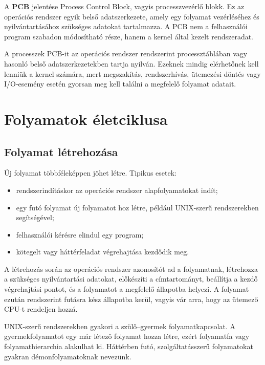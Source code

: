 A \textbf{PCB} jelentése Process Control Block, vagyis processzvezérlő blokk. Ez az operációs rendszer egyik belső adatszerkezete, amely egy folyamat vezérléséhez és nyilvántartásához szükséges adatokat tartalmazza. A PCB nem a felhasználói program szabadon módosítható része, hanem a kernel által kezelt rendszeradat.

A processzek PCB-it az operációs rendszer rendszerint processztáblában vagy hasonló belső adatszerkezetekben tartja nyilván. Ezeknek mindig elérhetőnek kell lenniük a kernel számára, mert megszakítás, rendszerhívás, ütemezési döntés vagy I/O-esemény esetén gyorsan meg kell találni a megfelelő folyamat adatait.

\begin{center}

\end{center}

\section{Folyamatok életciklusa}

\subsection{Folyamat létrehozása}

Új folyamat többféleképpen jöhet létre. Tipikus esetek:

\begin{itemize}
  \item rendszerindításkor az operációs rendszer alapfolyamatokat indít;
  \item egy futó folyamat új folyamatot hoz létre, például UNIX-szerű rendszerekben  segítségével;
  \item felhasználói kérésre elindul egy program;
  \item kötegelt vagy háttérfeladat végrehajtása kezdődik meg.
\end{itemize}

A létrehozás során az operációs rendszer azonosítót ad a folyamatnak, létrehozza a szükséges nyilvántartási adatokat, előkészíti a címtartományt, beállítja a kezdő végrehajtási pontot, és a folyamatot a megfelelő állapotba helyezi. A folyamat ezután rendszerint futásra kész állapotba kerül, vagyis vár arra, hogy az ütemező CPU-t rendeljen hozzá.

UNIX-szerű rendszerekben gyakori a szülő--gyermek folyamatkapcsolat. A gyermekfolyamatot egy már létező folyamat hozza létre, ezért folyamatfa vagy folyamathierarchia alakulhat ki. Háttérben futó, szolgáltatásszerű folyamatokat gyakran démonfolyamatoknak nevezünk.

